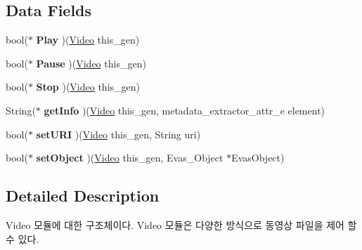 \subsection*{Data Fields}
\begin{DoxyCompactItemize}
\item 
\hypertarget{struct__Video_aef888a8e657f38d44001a2545ad9bcb1}{bool($\ast$ {\bfseries Play} )(\hyperlink{struct__Video}{Video} this\-\_\-gen)}\label{struct__Video_aef888a8e657f38d44001a2545ad9bcb1}

\item 
\hypertarget{struct__Video_a1144f0da810f7d94cf57acd612731803}{bool($\ast$ {\bfseries Pause} )(\hyperlink{struct__Video}{Video} this\-\_\-gen)}\label{struct__Video_a1144f0da810f7d94cf57acd612731803}

\item 
\hypertarget{struct__Video_a1c9916d4c5b3271d563d4857dc365a18}{bool($\ast$ {\bfseries Stop} )(\hyperlink{struct__Video}{Video} this\-\_\-gen)}\label{struct__Video_a1c9916d4c5b3271d563d4857dc365a18}

\item 
\hypertarget{struct__Video_a28466d9896b523beacac4a1add633aa6}{String($\ast$ {\bfseries get\-Info} )(\hyperlink{struct__Video}{Video} this\-\_\-gen, metadata\-\_\-extractor\-\_\-attr\-\_\-e element)}\label{struct__Video_a28466d9896b523beacac4a1add633aa6}

\item 
\hypertarget{struct__Video_a3d9407567e93bffc6b9121c742fa90e1}{bool($\ast$ {\bfseries set\-U\-R\-I} )(\hyperlink{struct__Video}{Video} this\-\_\-gen, String uri)}\label{struct__Video_a3d9407567e93bffc6b9121c742fa90e1}

\item 
\hypertarget{struct__Video_a42ce7237758001acc69e762904354aae}{bool($\ast$ {\bfseries set\-Object} )(\hyperlink{struct__Video}{Video} this\-\_\-gen, Evas\-\_\-\-Object $\ast$Evas\-Object)}\label{struct__Video_a42ce7237758001acc69e762904354aae}

\end{DoxyCompactItemize}


\subsection{Detailed Description}
Video 모듈에 대한 구조체이다. Video 모듈은 다양한 방식으로 동영상 파일을 제어 할 수 있다. 

